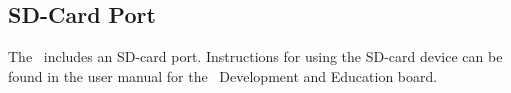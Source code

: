 \subsection{SD-Card Port}
The \systemName~includes an SD-card port. Instructions for using the SD-card device can be
found in the user manual for the \DEBoard~Development and Education board.